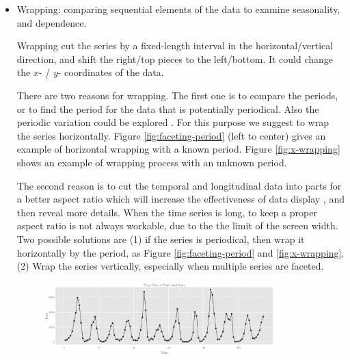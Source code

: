 \documentclass[12pt]{article}
\begin{document}
\begin{itemize}

\item Wrapping: comparing sequential elements of the
data to examine seasonality, and dependence.

Wrapping cut the series by a fixed-length interval in
the horizontal/vertical direction, and shift the right/top pieces
to the left/bottom. It could change the $x$- / $y$- coordinates of the
data.

There are two reasons for wrapping. The first one
is to compare the periods, or to find the period for the data
that is potentially periodical. Also the periodic variation
could be explored \citep{mcdonald1986periodic}. For this
purpose we suggest to wrap the series horizontally. Figure
\ref{fig:faceting-period} (left to center) gives an example
of horizontal wrapping with a known period. Figure \ref{fig:x-wrapping}
shows an example of wrapping process with an unknown period.

The second reason is to cut the temporal and longitudinal data into
parts for a better aspect ratio which will increase the effectiveness
of data display \citep{cleveland1987graphical}, and then reveal more
details. When the time series is long, to keep a proper aspect ratio
is not always workable, due to the the limit of the screen width.
Two possible solutions are  (1) if the series is periodical, then wrap
it horizontally by the period, as Figure \ref{fig:faceting-period}
and \ref{fig:x-wrapping}.  (2) Wrap the series vertically, especially
when multiple series are faceted.


\begin{center}
\begin{figure}[H]
\begin{centering}
\includegraphics[width=0.84\textwidth]{graph/pipeline-16-original}
\par\end{centering}


\end{figure}
\end{center}
\end{itemize}
\end{document}
